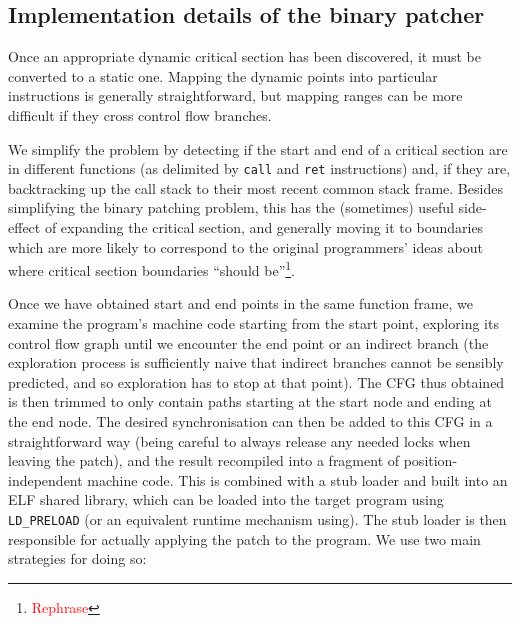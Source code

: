 \documentclass[10pt,twocolumn,preprint,natbib,authoryear]{sigplanconf}
\newcommand{\editorial}[1]{\textcolor{red}{\footnote{\textcolor{red}{#1}}}}
\begin{document}
\subsection{Implementation details of the binary patcher}
\label{sect:binpatch}

Once an appropriate dynamic critical section has been discovered, it
must be converted to a static one.  Mapping the dynamic points into
particular instructions is generally straightforward, but mapping
ranges can be more difficult if they cross control flow branches.

We simplify the problem by detecting if the start and end of a
critical section are in different functions (as delimited by
\verb|call| and \verb|ret| instructions) and, if they are,
backtracking up the call stack to their most recent common stack
frame.  Besides simplifying the binary patching problem, this has the
(sometimes) useful side-effect of expanding the critical section, and
generally moving it to boundaries which are more likely to correspond
to the original programmers' ideas about where critical section
boundaries ``should be''\editorial{Rephrase}.

Once we have obtained start and end points in the same function frame,
we examine the program's machine code starting from the start point,
exploring its control flow graph until we encounter the end point or
an indirect branch (the exploration process is sufficiently naive that
indirect branches cannot be sensibly predicted, and so exploration has
to stop at that point).  The CFG thus obtained is then trimmed to only
contain paths starting at the start node and ending at the end node.
The desired synchronisation can then be added to this CFG in a
straightforward way (being careful to always release any needed locks
when leaving the patch), and the result recompiled into a fragment of
position-independent machine code.  This is combined with a stub
loader and built into an ELF shared library, which can be loaded into
the target program using \verb|LD_PRELOAD| (or an equivalent runtime
mechanism using).  The stub loader is then responsible for actually
applying the patch to the program.  We use two main strategies for
doing so:
\end{document}
